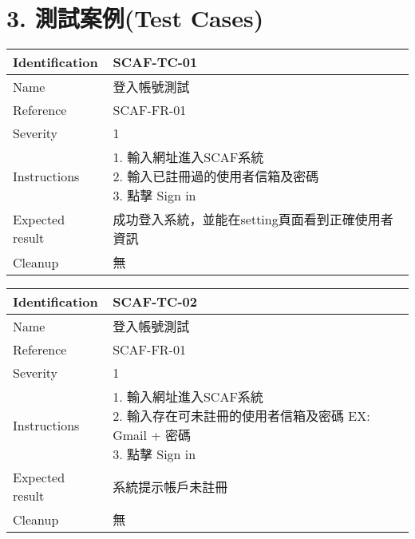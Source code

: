 \documentclass{report}
\begin{document}
\section*{3. 測試案例(Test Cases)}
\begin{tabularx}{0.9\textwidth}{
  |p{}%
  |p{}|%
  }
  \hline
  \centering Identification &  SCAF-TC-01 \\
  \hline
  \centering Name & 登入帳號測試 \\
  \hline
  \centering Reference & SCAF-FR-01 \\
  \hline
  \centering Severity & 1 \\
  \hline
  \centering Instructions & 
  \makecell{
    1. 輸入網址進入SCAF系統 \\
    2. 輸入已註冊過的使用者信箱及密碼 \\
    3. 點擊 Sign in
  }\\
  \hline
  \centering Expected result & 成功登入系統，並能在setting頁面看到正確使用者資訊 \\
  \hline
  \centering Cleanup & 無 \\
  \hline
\end{tabularx}
\newline\newline

\begin{tabularx}{0.9\textwidth}{
  |p{}%
  |p{}|%
  }
  \hline
  \centering Identification &  SCAF-TC-02 \\
  \hline
  \centering Name & 登入帳號測試 \\
  \hline
  \centering Reference & SCAF-FR-01 \\
  \hline
  \centering Severity & 1 \\
  \hline
  \centering Instructions & 
  \makecell{
    1. 輸入網址進入SCAF系統 \\
    2. 輸入存在可未註冊的使用者信箱及密碼 EX: Gmail + 密碼 \\
    3. 點擊 Sign in
  }\\
  \hline
  \centering Expected result & 系統提示帳戶未註冊 \\
  \hline
  \centering Cleanup & 無 \\
  \hline
\end{tabularx}
\newline\newline
\end{document}
